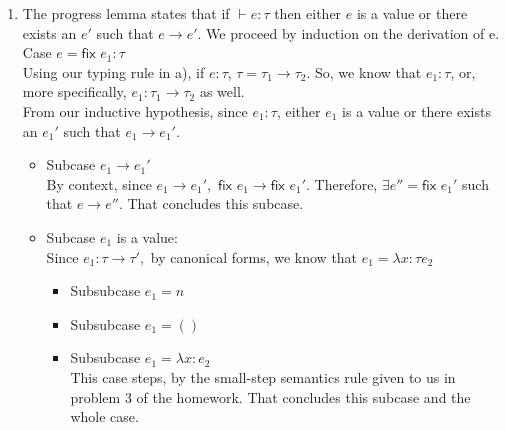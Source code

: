 \documentclass[10pt, oneside]{article}
\begin{document}
\begin{enumerate}
\begin{enumerate}
		\item The progress lemma states that if $\vdash e : \tau $ then either $e$ is a value or there exists an $e'$ such that $ e \rightarrow e'.$
		We proceed by induction on the derivation of e.\\
					
		{\sc Case} $e =  \textsf{fix } e_1: \tau$\\
		
		Using our typing rule in a), if $e: \tau$, $\tau =  \tau_1 \rightarrow \tau_2.$ So, we know that $e_1: \tau$, or, more specifically, $e_1: \tau_1 \rightarrow \tau_2$ as well.\\
		
		From our inductive hypothesis, since  $e_1: \tau$,  either $e_1$ is a value or there exists an $e_1'$ such that $e_1 \rightarrow e_1'.$\\
		
		\begin{itemize}
		\item {\sc Subcase} $e_1 \rightarrow e_1'$ \\
		
		By {\sc context}, since $e_1 \rightarrow e_1',$ $\textsf{fix } e_1 \rightarrow \textsf{fix }e_1'.$ Therefore, $\exists e'' = \textsf{fix }e_1'$ such that $e \rightarrow e''.$ That concludes this subcase. \checkmark \checkmark \\
		
		\item {\sc Subcase} $e_1$ is a value:\\
		
		Since $e_1: \tau \rightarrow \tau',$ by canonical forms, we know that $e_1 = \lambda x:\tau e_2$\\

		\begin{itemize}
		\item {\sc Subsubcase} $e_1 = n$\\ 
		
		\item {\sc Subsubcase} $e_1 = ()$\\  
		
		\item {\sc Subsubcase} $e_1 = \lambda x: e_2$\\
		This case steps, by the small-step semantics rule given to us in problem 3 of the homework. That concludes this subcase and the whole case.\\
		\end{itemize}
		\end{itemize}


\end{enumerate}
\end{enumerate}
\end{document}
